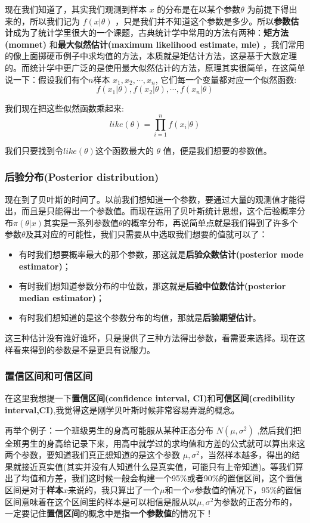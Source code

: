 \documentclass[12pt]{article}
\begin{document}
现在我们知道了，其实我们观测到样本 $x$ 的分布是在以某个参数$\theta$ 为前提下得出来的，所以我们记为 $f(x|\theta)$ ，只是我们并不知道这个参数是多少。所以\textbf{参数估计}成为了统计学里很大的一个课题，古典统计学中常用的方法有两种：\textbf{矩方法(momnet)} 和\textbf{最大似然估计(maximum likelihood estimate, mle) }，我们常用的像上面掷硬币例子中求均值的方法，本质就是矩估计方法，这是基于大数定理的。而统计学中更广泛的是使用最大似然估计的方法，原理其实很简单，在这简单说一下：假设我们有个$n$样本 $x_1, x_2, \cdots, x_n$, 它们每一个变量都对应一个似然函数:
$$
f(x_1|\theta), f(x_2|\theta), \cdots, f(x_n|\theta)
$$

我们现在把这些似然函数乘起来:
$$
like(\theta) = \prod_{i=1}^nf(x_i|\theta)
$$

我们只要找到令$like(\theta)$这个函数最大的 $\theta$ 值，便是我们想要的参数值。

\subsubsection{后验分布(Posterior distribution)}
现在到了贝叶斯的时间了。以前我们想知道一个参数，要通过大量的观测值才能得出，而且是只能得出一个参数值。而现在运用了贝叶斯统计思想，这个后验概率分布$\pi(\theta|x)$其实是一系列参数值$\theta$的概率分布，再说简单点就是我们得到了许多个参数$\theta$及其对应的可能性，我们只需要从中选取我们想要的值就可以了：
\begin{itemize}
\setlength{\itemsep}{0pt}
\setlength{\parsep}{0pt}
\setlength{\parskip}{0pt}
    \item 有时我们想要概率最大的那个参数，那这就是\textbf{后验众数估计(posterior mode estimator)}；
    \item 有时我们想知道参数分布的中位数，那这就是\textbf{后验中位数估计(posterior median estimator)}；
    \item 有时我们想知道的是这个参数分布的均值，那就是\textbf{后验期望估计}。
\end{itemize}

这三种估计没有谁好谁坏，只是提供了三种方法得出参数，看需要来选择。现在这样看来得到的参数是不是更具有说服力。

\subsubsection{置信区间和可信区间}
在这里我想提一下\textbf{置信区间(confidence interval, CI)}和\textbf{可信区间(credibility interval,CI)},我觉得这是刚学贝叶斯时候非常容易弄混的概念。

再举个例子：一个班级男生的身高可能服从某种正态分布 $N(\mu, \sigma^2)$ ,然后我们把全班男生的身高给记录下来，用高中就学过的求均值和方差的公式就可以算出来这两个参数，要知道我们真正想知道的是这个参数 $\mu, \sigma^2$，当然样本越多，得出的结果就接近真实值(其实并没有人知道什么是真实值，可能只有上帝知道)。等我们算出了均值和方差，我们这时候一般会构建一个95\%或者90\%的置信区间，这个置信区间是对于\textbf{样本}$x$来说的，我只算出了一个$\mu$和一个$\sigma$参数值的情况下，95\%的置信区间意味着在这个区间里的样本是可以相信是服从以$\mu, \sigma^2$为参数的正态分布的，一定要记住\textbf{置信区间}的概念中是指\textbf{一个参数值}的情况下！
\end{document}
